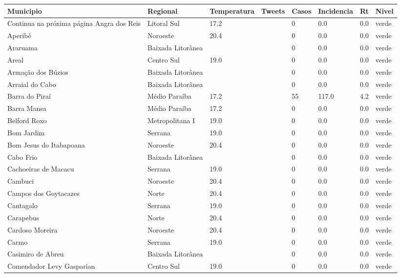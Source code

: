 \begin{longtable}{l|lllllll}
  \hline
Municipio & Regional & Temperatura & Tweets & Casos & Incidencia & Rt & Nivel \\ 
  \hline
\endhead
\hline
{\footnotesize Continua na próxima página}
\endfoot
\endlastfoot
Angra dos Reis & Litoral Sul & 17.2 &  & 0 & 0.0 & 0.0 & verde \\ 
  Aperibé & Noroeste & 20.4 &  & 0 & 0.0 & 0.0 & verde \\ 
  Araruama & Baixada Litorânea &  &  & 0 & 0.0 & 0.0 & verde \\ 
  Areal & Centro Sul & 19.0 &  & 0 & 0.0 & 0.0 & verde \\ 
  Armação dos Búzios & Baixada Litorânea &  &  & 0 & 0.0 & 0.0 & verde \\ 
  Arraial do Cabo & Baixada Litorânea &  &  & 0 & 0.0 & 0.0 & verde \\ 
  Barra do Piraí & Médio Paraíba & 17.2 &  & 55 & 117.0 & 4.2 & verde \\ 
  Barra Mansa & Médio Paraíba & 17.2 &  & 0 & 0.0 & 0.0 & verde \\ 
  Belford Roxo & Metropolitana I & 19.0 &  & 0 & 0.0 & 0.0 & verde \\ 
  Bom Jardim & Serrana & 19.0 &  & 0 & 0.0 & 0.0 & verde \\ 
  Bom Jesus do Itabapoana & Noroeste & 20.4 &  & 0 & 0.0 & 0.0 & verde \\ 
  Cabo Frio & Baixada Litorânea &  &  & 0 & 0.0 & 0.0 & verde \\ 
  Cachoeiras de Macacu & Serrana & 19.0 &  & 0 & 0.0 & 0.0 & verde \\ 
  Cambuci & Noroeste & 20.4 &  & 0 & 0.0 & 0.0 & verde \\ 
  Campos dos Goytacazes & Norte & 20.4 &  & 0 & 0.0 & 0.0 & verde \\ 
  Cantagalo & Serrana & 19.0 &  & 0 & 0.0 & 0.0 & verde \\ 
  Carapebus & Norte & 20.4 &  & 0 & 0.0 & 0.0 & verde \\ 
  Cardoso Moreira & Noroeste & 20.4 &  & 0 & 0.0 & 0.0 & verde \\ 
  Carmo & Serrana & 19.0 &  & 0 & 0.0 & 0.0 & verde \\ 
  Casimiro de Abreu & Baixada Litorânea &  &  & 0 & 0.0 & 0.0 & verde \\ 
  Comendador Levy Gasparian & Centro Sul & 19.0 &  & 0 & 0.0 & 0.0 & verde \\ 

\end{longtable}
